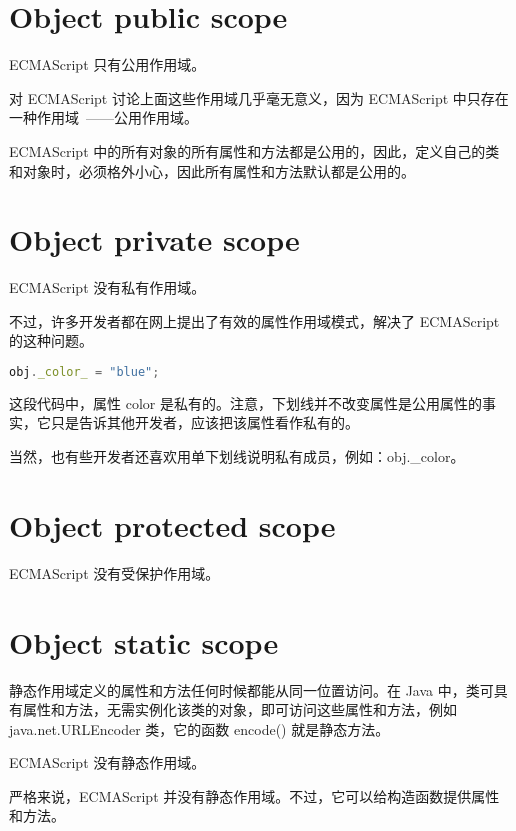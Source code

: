 \section{Object public scope}

ECMAScript 只有公用作用域。

对 ECMAScript 讨论上面这些作用域几乎毫无意义，因为 ECMAScript 中只存在一种作用域~——公用作用域。

ECMAScript 中的所有对象的所有属性和方法都是公用的，因此，定义自己的类和对象时，必须格外小心，因此所有属性和方法默认都是公用的。






\section{Object private scope}



ECMAScript 没有私有作用域。


不过，许多开发者都在网上提出了有效的属性作用域模式，解决了 ECMAScript 的这种问题。


\begin{lstlisting}[language=JavaScript]
obj._color_ = "blue";
\end{lstlisting}

这段代码中，属性 color 是私有的。注意，下划线并不改变属性是公用属性的事实，它只是告诉其他开发者，应该把该属性看作私有的。

当然，也有些开发者还喜欢用单下划线说明私有成员，例如：obj.\_color。


\section{Object protected scope}


ECMAScript 没有受保护作用域。




\section{Object static scope}

静态作用域定义的属性和方法任何时候都能从同一位置访问。在 Java 中，类可具有属性和方法，无需实例化该类的对象，即可访问这些属性和方法，例如 java.net.URLEncoder 类，它的函数 encode() 就是静态方法。

ECMAScript 没有静态作用域。

严格来说，ECMAScript 并没有静态作用域。不过，它可以给构造函数提供属性和方法。

